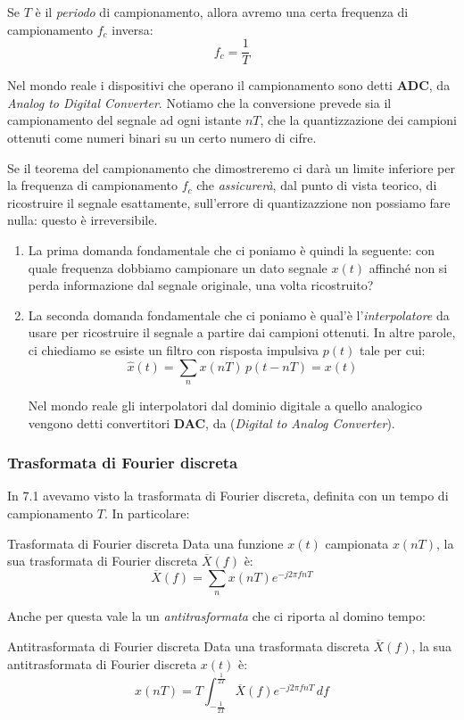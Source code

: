 \documentclass[a4paper,11pt]{article}
\begin{document}
Se $T$ è il \textit{periodo} di campionamento, allora avremo una certa frequenza di campionamento $f_c$ inversa:
$$
f_c = \frac{1}{T}
$$

Nel mondo reale i dispositivi che operano il campionamento sono detti \textbf{ADC}, da \textit{Analog to Digital Converter}. Notiamo che la conversione prevede sia il campionamento del segnale ad ogni istante $nT$, che la quantizzazione dei campioni ottenuti come numeri binari su un certo numero di cifre.

Se il teorema del campionamento che dimostreremo ci darà un limite inferiore per la frequenza di campionamento $f_c$ che \textit{assicurerà}, dal punto di vista teorico, di ricostruire il segnale esattamente, sull'errore di quantizazzione non possiamo fare nulla: questo è irreversibile. 

\begin{enumerate}
	\item 
La prima domanda fondamentale che ci poniamo è quindi la seguente: con quale frequenza dobbiamo campionare un dato segnale $x(t)$ affinché non si perda informazione dal segnale originale, una volta ricostruito?
	\item
La seconda domanda fondamentale che ci poniamo è qual'è l'\textit{interpolatore} da usare per ricostruire il segnale a partire dai campioni ottenuti. In altre parole, ci chiediamo se esiste un filtro con risposta impulsiva $p(t)$ tale per cui:
$$
\hat{x}(t) = \sum_n x(nT) \, p(t - nT) = x(t)
$$

Nel mondo reale gli interpolatori dal dominio digitale a quello analogico vengono detti convertitori \textbf{DAC}, da (\textit{Digital to Analog Converter}).
\end{enumerate}

\subsubsection{Trasformata di Fourier discreta}
In 7.1 avevamo visto la trasformata di Fourier discreta, definita con un tempo di campionamento $T$. In particolare:
\begin{definition}{Trasformata di Fourier discreta}
Data una funzione $x(t)$ campionata $x(nT)$, la sua trasformata di Fourier discreta $\overline{X}(f)$ è:
$$
\overline{X}(f) = \sum_n x(nT) e^{-j2 \pi f n T}
$$
\end{definition}

Anche per questa vale la un \textit{antitrasformata} che ci riporta al domino tempo:
\begin{definition}{Antitrasformata di Fourier discreta}
Data una trasformata discreta $\overline{X}(f)$, la sua antitrasformata di Fourier discreta $x(t)$ è: 
$$
x(nT) = T \int_{-\frac{1}{2T}}^{\frac{1}{2T}} \overline{X}(f) e^{-j 2 \pi f n T} \, df 
$$
\end{definition}
\end{document}
